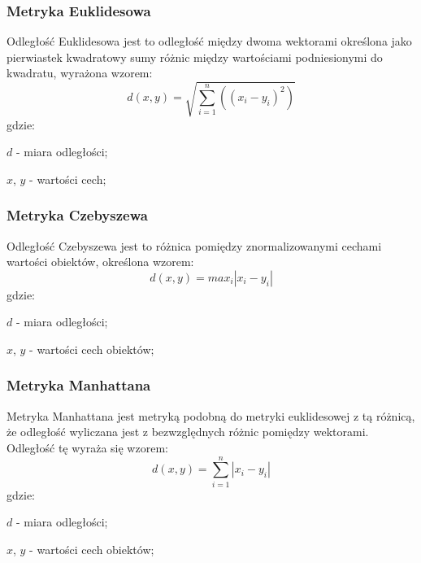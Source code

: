 \documentclass{classrep}
\begin{document}
\subsubsection{Metryka Euklidesowa}
Odległość Euklidesowa jest to odległość między dwoma wektorami określona jako pierwiastek kwadratowy sumy różnic między
wartościami podniesionymi do kwadratu, wyrażona wzorem:
\begin{equation}
    d(x,y)=\sqrt{\sum_{i=1}^{n}((x_{i}-y_{i})^{2})}
\end{equation}
gdzie:\\
\begin{description}
    \item $d$ - miara odległości;
    \item $x$, $y$ - wartości cech;
\end{description}

\subsubsection{Metryka Czebyszewa}
Odległość Czebyszewa jest to różnica pomiędzy znormalizowanymi cechami wartości obiektów, określona wzorem:
\begin{equation}
    d(x,y)=max_{i}|x_{i}-y_{i}|
\end{equation}
gdzie:\\
\begin{description}
    \item $d$ - miara odległości;
    \item $x$, $y$ - wartości cech obiektów;
\end{description}

\subsubsection{Metryka Manhattana}
Metryka Manhattana jest metryką podobną do metryki euklidesowej z tą różnicą, że odległość wyliczana jest
z bezwzględnych różnic pomiędzy wektorami. Odległość tę wyraża się wzorem:
\begin{equation}
    d(x,y)=\sum_{i=1}^{n} |x_{i}-y_{i}|
\end{equation}
gdzie:\\
\begin{description}
    \item $d$ - miara odległości;
    \item $x$, $y$ - wartości cech obiektów;
\end{description}
\end{document}

